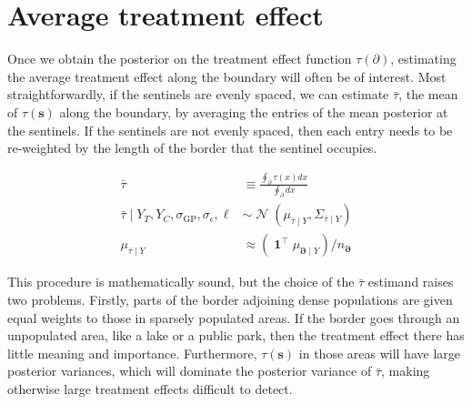 \documentclass[letter]{article}
\newcommand{\genericdel}[3]{%
      \left#1#3\right#2
    }
\newcommand{\del}[1]{\genericdel(){#1}}
\DeclareMathOperator{\normal}{\mathcal{N}}
\DeclareMathOperator{\ones}{\mathbf{1}}
\newcommand{\trans}{^{\intercal}}
\newcommand{\sigmaf}{\sigma_{\mathrm{GP}}}
\newcommand{\sigman}{\sigma_{\epsilon}}
\newcommand{\svec}{\mathbf{s}}
\newcommand{\boundary}{\partial}
\newcommand{\sentinels}{\bm{\boundary}}
\newcommand{\linavg}{\bar{\tau}}
\begin{document}
    	\section{Average treatment effect}\label{average-treatment-effect}

Once we obtain the posterior on the treatment effect function
\(\tau(\boundary)\), estimating the average treatment effect along the
boundary will often be of interest. Most straightforwardly, if the
sentinels are evenly spaced, we can estimate \(\linavg\), the mean of
\(\tau(\svec)\) along the boundary, by averaging the entries of the mean
posterior at the sentinels. If the sentinels are not evenly spaced, then
each entry needs to be re-weighted by the length of the border that the
sentinel occupies.

\begin{align}
    \linavg &\equiv \frac{\oint_\boundary \left. \tau(x) dx \right.}{\oint_\boundary \left. dx \right.} \\
    \linavg \mid Y_T, Y_C, \sigmaf, \sigman, \ell &\sim \normal\del{\mu_{\linavg \mid Y}, \Sigma_{\linavg \mid Y}} \\
    \mu_{\linavg \mid Y} &\approx \del{\ones\trans \mu_{\sentinels \mid Y}} / n_\sentinels
\end{align}

This procedure is mathematically sound, but the choice of the
\(\linavg\) estimand raises two problems. Firstly, parts of the border
adjoining dense populations are given equal weights to those in sparsely
populated areas. If the border goes through an unpopulated area, like a
lake or a public park, then the treatment effect there has little
meaning and importance. Furthermore, \(\tau(\svec)\) in those areas will
have large posterior variances, which will dominate the posterior
variance of \(\linavg\), making otherwise large treatment effects
difficult to detect.
\end{document}
